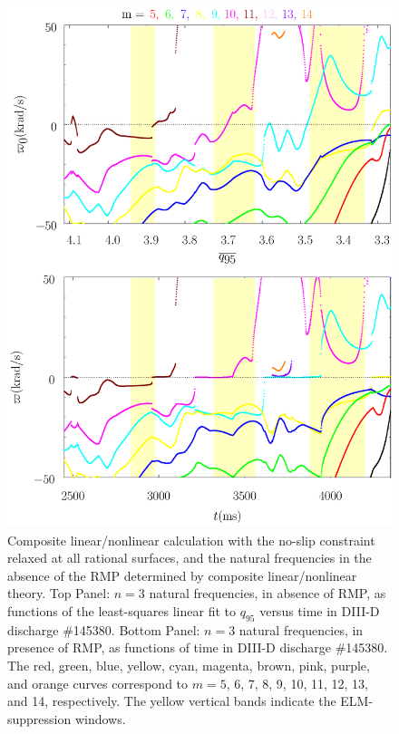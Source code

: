 \documentclass[12pt,prb,aps]{revtex4-1}
\begin{document}
\begin{figure}
\includegraphics[height=6in]{fig9.pdf}
\caption{Composite linear/nonlinear calculation with the no-slip constraint relaxed at all rational surfaces, and  the natural frequencies
in the absence of the RMP determined by composite linear/nonlinear theory. Top Panel: $n=3$ natural frequencies, in absence of RMP, as functions of the least-squares linear fit to $q_{95}$ versus time
in   DIII-D discharge \#145380.
Bottom Panel:  $n=3$ natural frequencies, in presence of RMP, as functions of time
in   DIII-D discharge \#145380. The red, green, blue, yellow, cyan, magenta, brown, pink,
purple, and orange  curves correspond to $m=5$, 6, 7, 8, 9, 10, 11, 12, 13, and 14, respectively. The yellow vertical bands indicate the ELM-suppression windows.} \label{fig9}
\end{figure}
\end{document}
